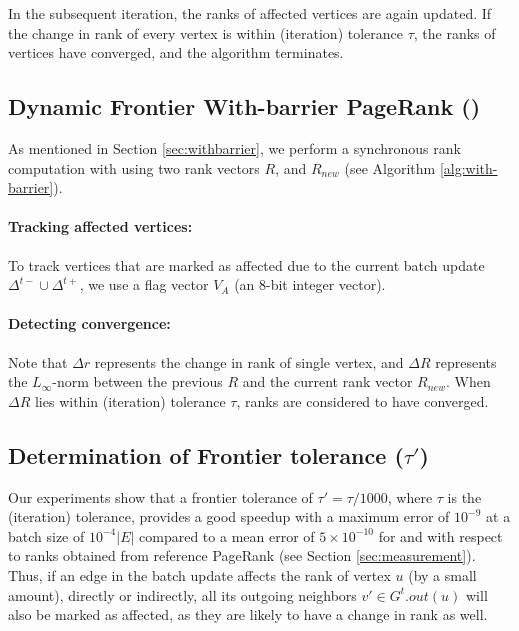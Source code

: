 In the subsequent iteration, the ranks of affected vertices are again updated. If the change in rank of every vertex is within (iteration) tolerance $\tau$, the ranks of vertices have converged, and the algorithm terminates.




\subsection{Dynamic Frontier With-barrier PageRank (\FroWbar{})}
\label{sec:frontier-withbarrier}

As mentioned in Section \ref{sec:withbarrier}, we perform a synchronous rank computation with \FroWbar{} using two rank vectors $R$, and $R_{new}$ (see Algorithm \ref{alg:with-barrier}).

\paragraph{Tracking affected vertices:}

To track vertices that are marked as affected due to the current batch update $\Delta^{t-} \cup \Delta^{t+}$, we use a flag vector $V_A$ (an 8-bit integer vector).

\paragraph{Detecting convergence:}

Note that $\Delta r$ represents the change in rank of single vertex, and $\Delta R$ represents the $L_\infty$-norm between the previous $R$ and the current rank vector $R_{new}$. When $\Delta R$ lies within (iteration) tolerance $\tau$, ranks are considered to have converged.




\subsection{Determination of Frontier tolerance ($\tau'$)}

Our experiments show that a frontier tolerance of $\tau' = \tau/1000$, where $\tau$ is the (iteration) tolerance, provides a good speedup with a maximum error of $10^{-9}$ at a batch size of $10^{-4} |E|$ compared to a mean error of $5 \times 10^{-10}$ for \NaiWbar{} and \NaiBarf{} with respect to ranks obtained from reference PageRank (see Section \ref{sec:measurement}). Thus, if an edge in the batch update affects the rank of vertex $u$ (by a small amount), directly or indirectly, all its outgoing neighbors $v' \in G^t.out(u)$ will also be marked as affected, as they are likely to have a change in rank as well.

